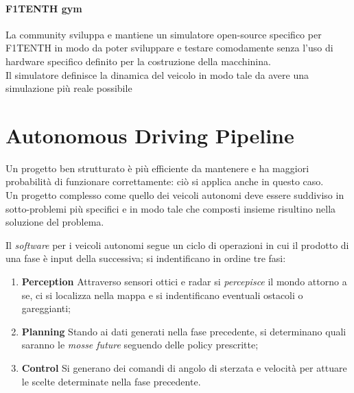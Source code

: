 \paragraph{F1TENTH gym}
\label{par:gym}
La community sviluppa e mantiene un simulatore open-source specifico per F1TENTH
in modo da poter sviluppare e testare comodamente
senza l'uso di hardware specifico definito per la costruzione della macchinina.\\
Il simulatore definisce la dinamica del veicolo in modo tale da avere una simulazione
più reale possibile %



\section{Autonomous Driving Pipeline}
Un progetto ben strutturato è più efficiente da mantenere e ha maggiori probabilità
di funzionare correttamente: ciò si applica anche in questo caso.\\
Un progetto complesso come quello dei veicoli autonomi deve essere suddiviso in sotto-problemi
più specifici e in modo tale che composti insieme risultino nella soluzione del problema.
\par

\noindent Il \emph{software} per i veicoli autonomi segue un ciclo di operazioni
in cui il prodotto di una fase è input della successiva; si indentificano in ordine tre fasi:
\begin{enumerate}
	\item \textbf{Perception} Attraverso sensori ottici e radar si \emph{percepisce} il mondo attorno a se,
	      ci si localizza nella mappa e si indentificano eventuali ostacoli o gareggianti;
	\item \textbf{Planning} Stando ai dati generati nella fase precedente,
	      si determinano quali saranno le \emph{mosse future} seguendo delle policy prescritte;
	\item \textbf{Control} Si generano dei comandi di angolo di sterzata e velocità per attuare le scelte
	      determinate nella fase precedente.
\end{enumerate}

